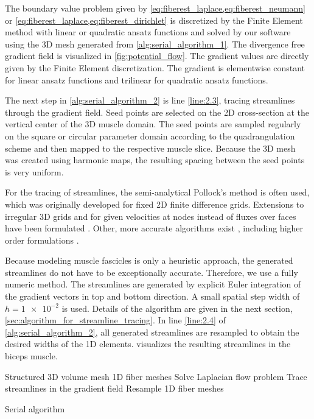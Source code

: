 The boundary value problem given by \cref{eq:fiberest_laplace,eq:fiberest_neumann}  or \cref{eq:fiberest_laplace,eq:fiberest_dirichlet} is discretized by the Finite Element method with linear or quadratic ansatz functions and solved by our software \opendihu{} using the 3D mesh generated from \cref{alg:serial_algorithm_1}. The divergence free gradient field is visualized in \cref{fig:potential_flow}. The gradient values are directly given by the Finite Element discretization. The gradient is elementwise constant for linear ansatz functions and trilinear for quadratic ansatz functions.

The next step in \cref{alg:serial_algorithm_2} is line \ref{line:2.3}, tracing streamlines through the gradient field. Seed points are selected on the 2D cross-section at the vertical center of the 3D muscle domain. The seed points are sampled regularly on the square or circular parameter domain according to the quadrangulation scheme and then mapped to the respective muscle slice.
Because the 3D mesh was created using harmonic maps, the resulting spacing between the seed points is very uniform.

For the tracing of streamlines, the semi-analytical Pollock's method \cite{Pollock1988} is often used, which was originally developed for fixed 2D finite difference grids. Extensions to irregular 3D grids and for given velocities at nodes instead of fluxes over faces have been formulated \cite{HAEGLAND2007Streamline}. Other, more accurate algorithms exist \cite{cordes1992continuous}, including higher order formulations \cite{juanes2006unified}.

Because modeling muscle fascicles is only a heuristic approach, the generated streamlines do not have to be exceptionally accurate. Therefore, we use a fully numeric method. The streamlines are generated by explicit Euler integration of the gradient vectors in top and bottom direction. A small spatial step width of $h=\num{1e-2}$ is used. Details of the algorithm are given in the next section, \cref{sec:algorithm_for_streamline_tracing}. In line \ref{line:2.4} of \cref{alg:serial_algorithm_2}, all generated streamlines are resampled to obtain the desired widths of the 1D elements.
 visualizes the resulting streamlines in the biceps muscle.

\begin{algorithm}
  \begin{algorithmic}[1]%
    \Statex{}
    \Require Structured 3D volume mesh
    \Ensure 1D fiber meshes
    \Statex
    \State Solve Laplacian flow problem   \label{line:2.2}
    \State Trace streamlines in the gradient field  \label{line:2.3}
    \State Resample 1D fiber meshes \label{line:2.4}
    \EndProcedure
  \end{algorithmic}%
  \caption{Serial algorithm}%
  \label{alg:serial_algorithm_2}%
\end{algorithm}%

